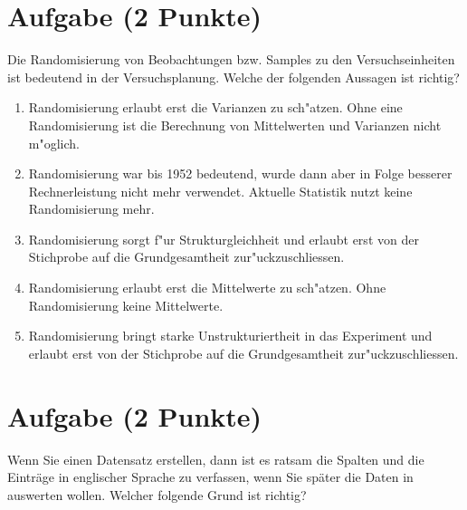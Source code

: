 \documentclass[a4paper, 10pt]{scrartcl}\usepackage[]{graphicx}\usepackage[]{xcolor}
\begin{document}
\section{Aufgabe \hfill (2 Punkte)}

Die Randomisierung von Beobachtungen bzw. Samples zu den Versuchseinheiten
ist bedeutend in der Versuchsplanung. Welche der folgenden Aussagen ist richtig?



\begin{enumerate}
\item [\textbf{A} \msquare] Randomisierung erlaubt erst die Varianzen zu sch{"a}tzen. Ohne eine Randomisierung ist die Berechnung von Mittelwerten und Varianzen nicht m{"o}glich.
\item [\textbf{B} \msquare] Randomisierung war bis 1952 bedeutend, wurde dann aber in Folge besserer Rechnerleistung nicht mehr verwendet. Aktuelle Statistik nutzt keine Randomisierung mehr.
\item [\textbf{C} \msquare] Randomisierung sorgt f{"u}r Strukturgleichheit und erlaubt erst von der Stichprobe auf die Grundgesamtheit zur{"u}ckzuschliessen.
\item [\textbf{D} \msquare] Randomisierung erlaubt erst die Mittelwerte zu sch{"a}tzen. Ohne Randomisierung keine Mittelwerte.
\item [\textbf{E} \msquare] Randomisierung bringt starke Unstrukturiertheit in das Experiment und erlaubt erst von der Stichprobe auf die Grundgesamtheit zur{"u}ckzuschliessen.
\end{enumerate}

\section{Aufgabe \hfill (2 Punkte)}

Wenn Sie einen Datensatz erstellen, dann ist es ratsam die Spalten und die
Eintr{\"a}ge in englischer Sprache zu verfassen, wenn Sie sp{\"a}ter die Daten in
\Rlogo auswerten wollen. Welcher folgende Grund ist richtig?
\end{document}
